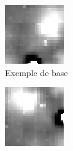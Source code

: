 \documentclass[a4paper, 12pt, titlepage, oneside, french]{article}
\begin{document}
	\begin{figure}[H]
		\centering
		\begin{subfigure}[t]{0.3\linewidth}
			\includegraphics[width=\linewidth]{ExempleBase.png}
			\caption{Exemple de base}
		\end{subfigure}
		\begin{subfigure}[t]{0.3\linewidth}
			\includegraphics[width=\linewidth]{Exemple90.png}

\end{subfigure}
\end{figure}
\end{document}
